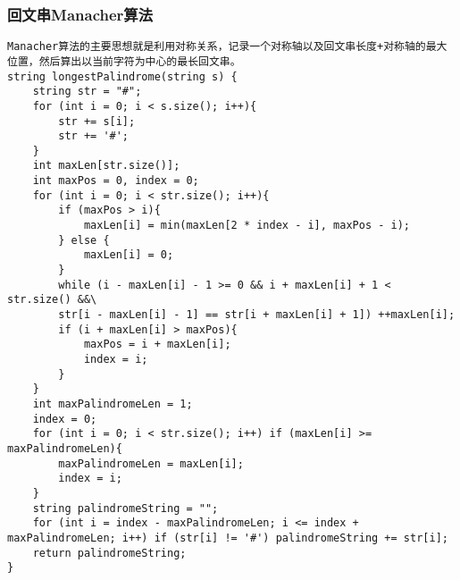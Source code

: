 \subsubsection{回文串Manacher算法}
\begin{verbatim}
Manacher算法的主要思想就是利用对称关系，记录一个对称轴以及回文串长度+对称轴的最大位置，然后算出以当前字符为中心的最长回文串。
string longestPalindrome(string s) {
    string str = "#";
    for (int i = 0; i < s.size(); i++){
        str += s[i];
        str += '#';
    }
    int maxLen[str.size()];
    int maxPos = 0, index = 0;
    for (int i = 0; i < str.size(); i++){
        if (maxPos > i){
            maxLen[i] = min(maxLen[2 * index - i], maxPos - i);
        } else {
            maxLen[i] = 0;
        }
        while (i - maxLen[i] - 1 >= 0 && i + maxLen[i] + 1 < str.size() &&\
        str[i - maxLen[i] - 1] == str[i + maxLen[i] + 1]) ++maxLen[i];
        if (i + maxLen[i] > maxPos){
            maxPos = i + maxLen[i];
            index = i;
        }
    }
    int maxPalindromeLen = 1;
    index = 0;
    for (int i = 0; i < str.size(); i++) if (maxLen[i] >= maxPalindromeLen){
        maxPalindromeLen = maxLen[i];
        index = i;
    }
    string palindromeString = "";
    for (int i = index - maxPalindromeLen; i <= index + maxPalindromeLen; i++) if (str[i] != '#') palindromeString += str[i];
    return palindromeString;
}

\end{verbatim} 
